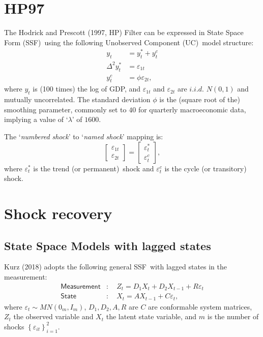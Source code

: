 \documentclass[a4paper,final,12pt]{article}
\newcommand{\bsq}{\begin{subequations}}\newcommand{\esq}{\end{subequations}}
\begin{document}
\section{HP97}

The Hodrick and Prescott (1997, HP) Filter can be expressed in State Space
Form (SSF)\ using the following Unobserved Component (UC)\ model structure:%
\bsq\label{HP0}%
\begin{align}
y_{t}& =y_{t}^{\ast }+y_{t}^{c}  \label{HP0a} \\
\Delta ^{2}y_{t}^{\ast }& =\varepsilon _{1t}  \label{HP0b} \\
y_{t}^{c}& =\phi \varepsilon _{2t},  \label{HP0c}
\end{align}%
\esq where $y_{t}$ is (100 times) the log of GDP, and $\varepsilon _{1t}$
and $\varepsilon _{2t}$ are $i.i.d.$ $N(0,1)$ and mutually uncorrelated. The
standard deviation $\phi $ is the (square root of the) smoothing parameter,
commonly set to $40$ for quarterly macroeconomic data, implying a value of `$%
\lambda $' of $1600$.

The `\emph{numbered} \emph{shock}' to `\emph{named shock}' mapping is:%
\begin{equation}
\begin{bmatrix}
\varepsilon _{1t} \\ 
\varepsilon _{2t}%
\end{bmatrix}%
=%
\begin{bmatrix}
\varepsilon _{t}^{\ast } \\ 
\varepsilon _{t}^{c}%
\end{bmatrix}%
,
\end{equation}%
where $\varepsilon _{t}^{\ast }$ is the trend (or permanent)\ shock and $%
\varepsilon _{t}^{c}$ is the cycle (or transitory) shock.

\section{Shock recovery}

\subsection{State Space Models with lagged states}

Kurz (2018) adopts the following general SSF\ with lagged states in the
measurement:\bsq\label{SSM}%
\begin{align}
\mathsf{Measurement}& :\quad Z_{t}=D_{1}X_{t}+D_{2}X_{t-1}+R\varepsilon _{t}
\label{ssm1} \\
\mathsf{State}& :\quad X_{t}=AX_{t-1}+C\varepsilon _{t},  \label{ssm2}
\end{align}%
\esq where $\varepsilon _{t}\sim MN(0_{m},I_{m})$, $D_{1},D_{2},A,R$ are $C$
are conformable system matrices, $Z_{t}$ the observed variable and $X_{t}$
the latent state variable, and $m$ is the number of shocks $\left\{
\varepsilon _{it}\right\} _{i=1}^{2}$. 
\end{document}
